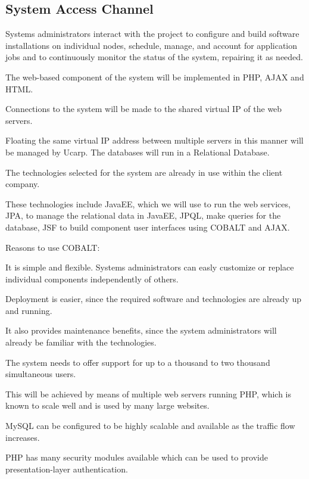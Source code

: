 \documentclass[a4paper,12pt]{report}
\begin{document}
\subsection{System Access Channel}
	\begin{description}
\item Systems administrators interact with the project to configure and build software installations on individual nodes, schedule, manage, and account for application jobs and to continuously monitor the status of the system, repairing it as needed.
\item The web-based component of the system will be implemented in PHP, AJAX and HTML. 
\item Connections to the system will be made to the shared virtual IP of the web servers. 
\item Floating the same virtual IP address between multiple servers in this manner will be managed by Ucarp. The databases will run in a Relational Database. 
\item The technologies selected for the system are already in use within the client company. 
\item These technologies include JavaEE, which we will use to run the web services, JPA, to manage the relational data in JavaEE, JPQL, make queries for the database, JSF to build component user interfaces using COBALT and AJAX. 

\item Reasons to use COBALT:
\item[$\bullet$] It is simple and flexible. Systems administrators can easly customize or replace individual components independently of others.
\item[$\bullet$] Deployment is easier, since the required software and technologies are already up and running.
\item[$\bullet$] It also provides maintenance benefits, since the system administrators will already be familiar with the technologies.
\item The system needs to offer support for up to a thousand to two thousand simultaneous users.

\item This will be achieved by means of multiple web servers running PHP, which is known to scale well and is used by many large websites. 
\item MySQL can be configured to be highly scalable and available as the traffic flow increases.
\item PHP has many security modules available which can be used to provide presentation-layer authentication.


\end{description}
\end{document}
